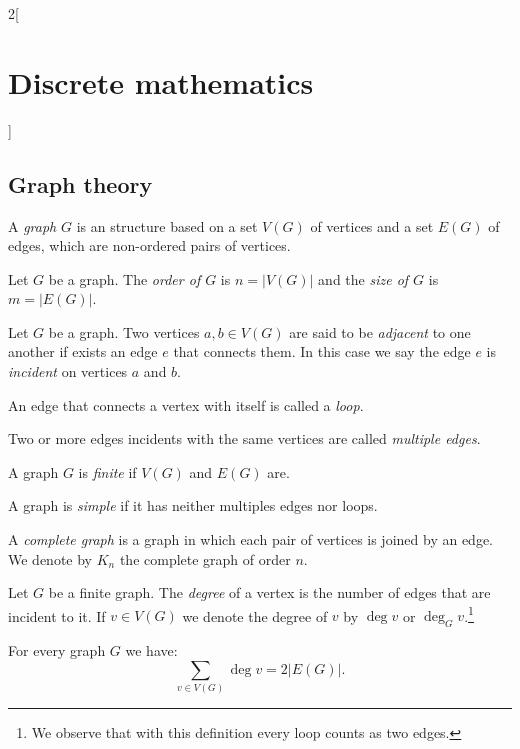 \documentclass[class=article,10pt,crop=false]{standalone}
\begin{document}
\begin{multicols}{2}[\section{Discrete mathematics}]
\subsection{Graph theory}
\begin{definition}
A \textit{graph} $G$ is an structure based on a set $V(G)$ of vertices and a set $E(G)$ of edges, which are non-ordered pairs of vertices.
\end{definition}
\begin{definition}
Let $G$ be a graph. The \textit{order of $G$} is $n=|V(G)|$ and the \textit{size of $G$} is $m=|E(G)|$.
\end{definition}
\begin{definition}
Let $G$ be a graph. Two vertices $a,b\in V(G)$ are said to be \textit{adjacent} to one another if exists an edge $e$ that connects them. In this case we say the edge $e$ is \textit{incident} on vertices $a$ and $b$.
\end{definition}
\begin{definition}
An edge that connects a vertex with itself is called a \textit{loop}.
\end{definition}
\begin{definition}
Two or more edges incidents with the same vertices are called \textit{multiple edges}.
\end{definition}
\begin{definition}
A graph $G$ is \textit{finite} if $V(G)$ and $E(G)$ are.
\end{definition}
\begin{definition}
A graph is \textit{simple} if it has neither multiples edges nor loops.
\end{definition}
\begin{definition}
A \textit{complete graph} is a graph in which each pair of vertices is joined by an edge. We denote by $K_n$ the complete graph of order $n$.
\end{definition}
\begin{definition}
Let $G$ be a finite graph. The \textit{degree} of a vertex is the number of edges that are incident to it. If $v\in V(G)$ we denote the degree of $v$ by $\deg v$ or $\deg_Gv$.\footnote{We observe that with this definition every loop counts as two edges.}
\end{definition}
\begin{lemma}
For every graph $G$ we have: $$\sum_{v\in V(G)}\deg v=2|E(G)|.$$
\end{lemma}
\begin{corollary}

\end{corollary}
\end{multicols}
\end{document}
